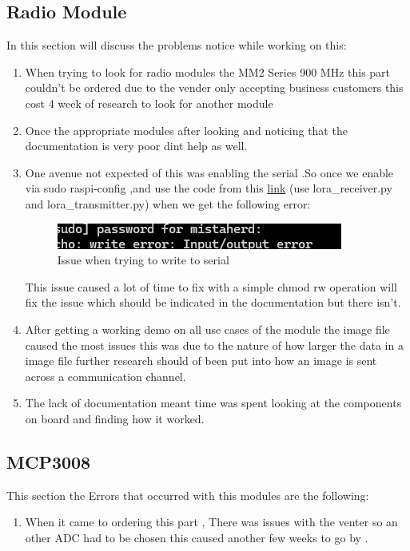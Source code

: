 \subsection{Radio Module}
In this section will discuss the problems notice while working on this:
\begin{enumerate}
    \item When trying to look for radio modules the MM2 Series 900 MHz this part couldn't be ordered due to the vender only accepting business customers this cost 4 week of research to look for another module
    \item Once the appropriate modules  after looking and noticing that the documentation is very poor dint help as well.
    \item One avenue not expected of this was enabling the serial .So once we enable via sudo raspi-config ,and use the code from this \href{https://github.com/sbcshop/Lora-HAT-for-Raspberry-Pi}{link} (use lora\_receiver.py and lora\_transmitter.py) when we get the following error:

    \begin{figure}[h!]
        \centering
        \includegraphics[width=0.5\linewidth]{Images/write_issue_linux_ser.png}
        \caption{Issue when trying to write to serial }
        \label{Issue when trying to write to serial}
    \end{figure}
    This issue caused a lot of time to fix with a simple chmod rw operation will fix the issue which should be  indicated in the documentation but there isn't.
    \item After getting a working demo on all use cases  of the module the image file caused  the most issues this was due to the nature of how larger the data in a  image file further research should of been put into  how an image is  sent across a communication channel.
    \item The lack of documentation meant time was spent looking at the components on board and  finding how it worked. 
\end{enumerate}
\subsection{MCP3008}
This section the Errors that occurred with this modules are the following:
\begin{enumerate}
    \item When it came to ordering this part , There was issues with the venter so an other ADC had to be chosen this caused another few weeks to go by .
\end{enumerate}
